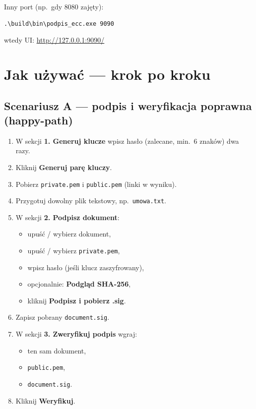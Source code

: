 \documentclass[12pt,a4paper]{article}
\begin{document}
Inny port (np.\ gdy 8080 zajęty):
\begin{verbatim}
.\build\bin\podpis_ecc.exe 9090
\end{verbatim}
wtedy UI: \url{http://127.0.0.1:9090/}

\section{Jak używać --- krok po kroku}

\subsection{Scenariusz A --- podpis i weryfikacja poprawna (happy-path)}

\begin{enumerate}[leftmargin=*]
  \item W sekcji \textbf{1. Generuj klucze} wpisz hasło (zalecane, min.\ 6 znaków) dwa razy.
  \item Kliknij \textbf{Generuj parę kluczy}.
  \item Pobierz \texttt{private.pem} i \texttt{public.pem} (linki w wyniku).
  \item Przygotuj dowolny plik tekstowy, np.\ \texttt{umowa.txt}.
  \item W sekcji \textbf{2. Podpisz dokument}:
    \begin{itemize}
      \item upuść / wybierz dokument,
      \item upuść / wybierz \texttt{private.pem},
      \item wpisz hasło (jeśli klucz zaszyfrowany),
      \item opcjonalnie: \textbf{Podgląd SHA-256},
      \item kliknij \textbf{Podpisz i pobierz .sig}.
    \end{itemize}
  \item Zapisz pobrany \texttt{document.sig}.
  \item W sekcji \textbf{3. Zweryfikuj podpis} wgraj:
    \begin{itemize}
      \item ten sam dokument,
      \item \texttt{public.pem},
      \item \texttt{document.sig}.
    \end{itemize}
  \item Kliknij \textbf{Weryfikuj}.
\end{enumerate}
\end{document}
